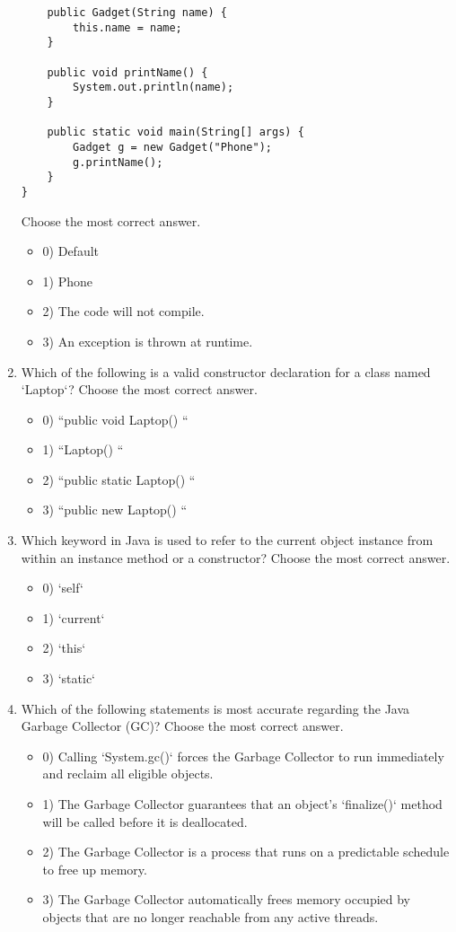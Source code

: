 \documentclass[12pt]{article}
\begin{document}
\begin{enumerate}[label=(\arabic*)]
\begin{verbatim}
    public Gadget(String name) {
        this.name = name;
    }

    public void printName() {
        System.out.println(name);
    }

    public static void main(String[] args) {
        Gadget g = new Gadget("Phone");
        g.printName();
    }
}
\end{verbatim}
Choose the most correct answer. 
\begin{itemize}
\item 0) Default
\item 1) Phone
\item 2) The code will not compile.
\item 3) An exception is thrown at runtime.
\end{itemize}
\item Which of the following is a valid constructor declaration for a class named `Laptop`?
Choose the most correct answer. 
\begin{itemize}
\item 0) ``public void Laptop() { }``
\item 1) ``Laptop() { }``
\item 2) ``public static Laptop() { }``
\item 3) ``public new Laptop() { }``
\end{itemize}
\item Which keyword in Java is used to refer to the current object instance from within an instance method or a constructor?
Choose the most correct answer. 
\begin{itemize}
\item 0) `self`
\item 1) `current`
\item 2) `this`
\item 3) `static`
\end{itemize}
\item Which of the following statements is most accurate regarding the Java Garbage Collector (GC)?
Choose the most correct answer. 
\begin{itemize}
\item 0) Calling `System.gc()` forces the Garbage Collector to run immediately and reclaim all eligible objects.
\item 1) The Garbage Collector guarantees that an object's `finalize()` method will be called before it is deallocated.
\item 2) The Garbage Collector is a process that runs on a predictable schedule to free up memory.
\item 3) The Garbage Collector automatically frees memory occupied by objects that are no longer reachable from any active threads.
\end{itemize}

\end{enumerate}
\end{document}
